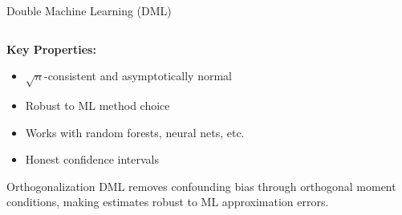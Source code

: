 \documentclass[aspectratio=169,11pt]{beamer}
\begin{document}
\begin{frame}{Double Machine Learning (DML)}
\begin{columns}
\begin{column}{0.5\textwidth}
\textbf{Key Properties:}
\begin{itemize}
\item $\sqrt{n}$-consistent and asymptotically normal
\item Robust to ML method choice
\item Works with random forests, neural nets, etc.
\item Honest confidence intervals
\end{itemize}

\begin{alertblock}{Orthogonalization}
DML removes confounding bias through orthogonal moment conditions, making estimates robust to ML approximation errors.
\end{alertblock}
\end{column}
\end{columns}
\end{frame}
\end{document}
